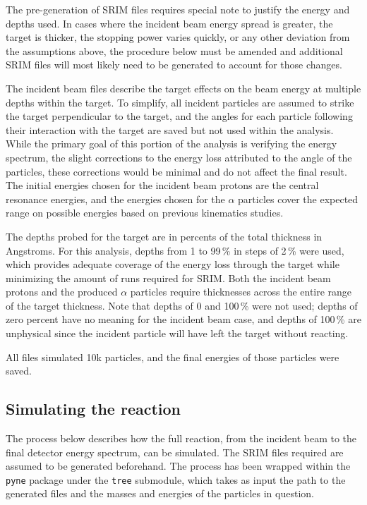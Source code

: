The pre-generation of SRIM files requires special note to justify the
energy and depths used. In cases where the incident beam energy spread
is greater, the target is thicker, the stopping power varies quickly, or
any other deviation from the assumptions above, the procedure below must
be amended and additional SRIM files will most likely need to be
generated to account for those changes.

The incident beam files describe the target effects on the beam energy
at multiple depths within the target. To simplify, all incident
particles are assumed to strike the target perpendicular to the target,
and the angles for each particle following their interaction with the
target are saved but not used within the analysis. While the primary
goal of this portion of the analysis is verifying the energy spectrum,
the slight corrections to the energy loss attributed to the angle of the
particles, these corrections would be minimal and do not affect the
final result. The initial energies chosen for the incident beam protons
are the central resonance energies, and the energies chosen for the
$\alpha$ particles cover the expected range on possible energies based
on previous kinematics studies.

The depths probed for the target are in percents of the total thickness
in Angstroms. For this analysis, depths from 1 to 99\,\% in steps of
2\,\% were used, which provides adequate coverage of the energy loss
through the target while minimizing the amount of runs required for
SRIM. Both the incident beam protons and the produced $\alpha$ particles
require thicknesses across the entire range of the target thickness.
Note that depths of 0 and 100\,\% were not used; depths of zero percent
have no meaning for the incident beam case, and depths of 100\,\% are
unphysical since the incident particle will have left the target without
reacting.

All files simulated 10k particles, and the final energies of those
particles were saved.


\subsection{Simulating the reaction}\label{simulating-the-reaction}

The process below describes how the full reaction, from the incident
beam to the final detector energy spectrum, can be simulated. The SRIM
files required are assumed to be generated beforehand. The process has
been wrapped within the \verb+pyne+ package under the \verb+tree+
submodule, which takes as input the path to the generated files and the
masses and energies of the particles in question.

